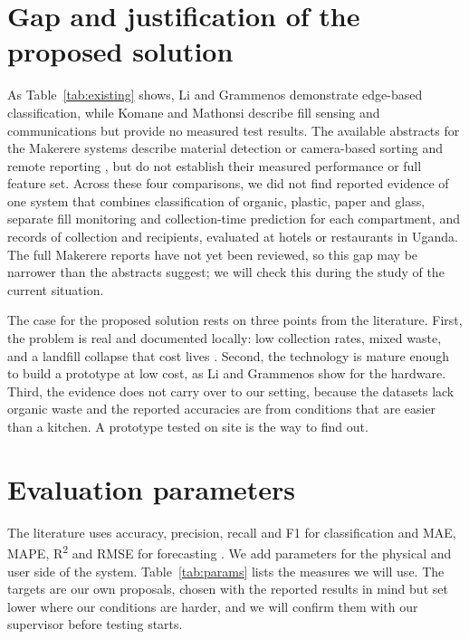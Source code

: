 \documentclass[12pt,a4paper]{report}
\begin{document}
\section{Gap and justification of the proposed solution}

As Table~\ref{tab:existing} shows, Li and Grammenos \cite{li} demonstrate edge-based classification, while Komane and Mathonsi \cite{komane} describe fill sensing and communications but provide no measured test results. The available abstracts for the Makerere systems describe material detection or camera-based sorting and remote reporting \cite{musoke,turyahebwa}, but do not establish their measured performance or full feature set. Across these four comparisons, we did not find reported evidence of one system that combines classification of organic, plastic, paper and glass, separate fill monitoring and collection-time prediction for each compartment, and records of collection and recipients, evaluated at hotels or restaurants in Uganda. The full Makerere reports have not yet been reviewed, so this gap may be narrower than the abstracts suggest; we will check this during the study of the current situation.

The case for the proposed solution rests on three points from the literature. First, the problem is real and documented locally: low collection rates, mixed waste, and a landfill collapse that cost lives \cite{mwesigwa,kcca2024b,petley}. Second, the technology is mature enough to build a prototype at low cost, as Li and Grammenos \cite{li} show for the hardware. Third, the evidence does not carry over to our setting, because the datasets lack organic waste and the reported accuracies are from conditions that are easier than a kitchen. A prototype tested on site is the way to find out.

\section{Evaluation parameters}

The literature uses accuracy, precision, recall and F1 for classification \cite{white,li} and MAE, MAPE, R\textsuperscript{2} and RMSE for forecasting \cite{ahmed}. We add parameters for the physical and user side of the system. Table~\ref{tab:params} lists the measures we will use. The targets are our own proposals, chosen with the reported results in mind but set lower where our conditions are harder, and we will confirm them with our supervisor before testing starts.
\end{document}
